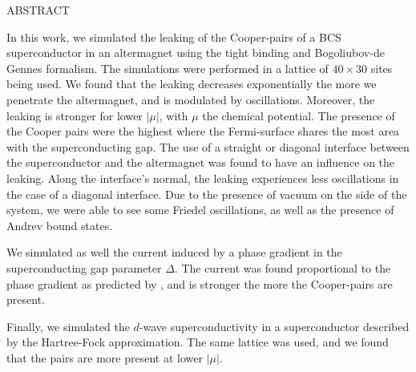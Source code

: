 \documentclass[../main.tex]{subfile}
\begin{document}
\thispagestyle{empty}
\vspace*{24pt}
\begin{center}
    \LARGE ABSTRACT \normalsize\vspace{24pt}\\
\end{center}
In this work, we simulated the leaking of the Cooper-pairs of a BCS superconductor \cite{FossheimSudbo2004} in an altermagnet \cite{Smejkal2022} using the tight binding and
Bogoliubov-de Gennes formalism. The simulations were performed in a lattice of $40\times30$ sites being used.
We found that the leaking decreases exponentially the more we penetrate the altermagnet, and is modulated by oscillations.
Moreover, the leaking is stronger for lower $|\mu|$, with $\mu$ the chemical potential. The presence of the Cooper pairs were the highest where 
the Fermi-surface shares the most area with the superconducting gap. The use of a straight or diagonal interface
between the superconductor and the altermagnet was found to have an influence on the leaking. Along the interface's normal, the leaking experiences less oscillations
in the case of a diagonal interface. Due to the presence of vacuum on the side of the system, we were able to see some Friedel oscillations, as well as
the presence of Andrev bound states.

We simulated as well the current induced by a phase gradient in the superconducting gap parameter $\Delta$.
The current was found proportional to the phase gradient as predicted by \cite{Orlando2003},
and is stronger the more the Cooper-pairs are present.

Finally, we simulated the $d$-wave superconductivity \cite{Mjos2019} in a superconductor described by the Hartree-Fock approximation.
The same lattice was used, and we found that the pairs are more present at lower $|\mu|$.
\end{document}
